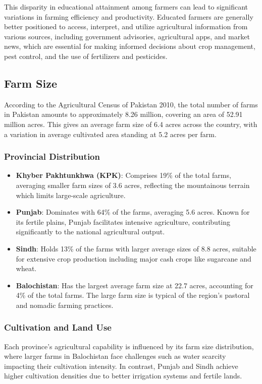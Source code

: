 \documentclass[12pt]{article}
\begin{document}
This disparity in educational attainment among farmers can lead to significant variations in farming efficiency and productivity. Educated farmers are generally better positioned to access, interpret, and utilize agricultural information from various sources, including government advisories, agricultural apps, and market news, which are essential for making informed decisions about crop management, pest control, and the use of fertilizers and pesticides.

\subsection{Farm Size}
According to the Agricultural Census of Pakistan 2010, the total number of farms in Pakistan amounts to approximately 8.26 million, covering an area of 52.91 million acres. This gives an average farm size of 6.4 acres across the country, with a variation in average cultivated area standing at 5.2 acres per farm.

\subsubsection{Provincial Distribution}
\begin{itemize}
    \item \textbf{Khyber Pakhtunkhwa (KPK)}: Comprises 19\% of the total farms, averaging smaller farm sizes of 3.6 acres, reflecting the mountainous terrain which limits large-scale agriculture.
    \item \textbf{Punjab}: Dominates with 64\% of the farms, averaging 5.6 acres. Known for its fertile plains, Punjab facilitates intensive agriculture, contributing significantly to the national agricultural output.
    \item \textbf{Sindh}: Holds 13\% of the farms with larger average sizes of 8.8 acres, suitable for extensive crop production including major cash crops like sugarcane and wheat.
    \item \textbf{Balochistan}: Has the largest average farm size at 22.7 acres, accounting for 4\% of the total farms. The large farm size is typical of the region's pastoral and nomadic farming practices.
\end{itemize}

\subsubsection{Cultivation and Land Use}
Each province's agricultural capability is influenced by its farm size distribution, where larger farms in Balochistan face challenges such as water scarcity impacting their cultivation intensity. In contrast, Punjab and Sindh achieve higher cultivation densities due to better irrigation systems and fertile lands.
\end{document}
